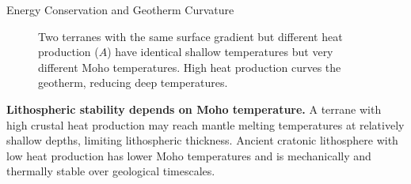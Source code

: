 \begin{activity}{Energy Conservation and Geotherm Curvature}
{{\begin{figure}[h]
\caption{Two terranes with the same surface gradient but different heat production ($A$) have identical shallow temperatures but very different Moho temperatures. High heat production curves the geotherm, reducing deep temperatures.}
\end{figure}
}

\textbf{Lithospheric stability depends on Moho temperature.} A terrane with high crustal heat production may reach mantle melting temperatures at relatively shallow depths, limiting lithospheric thickness. Ancient cratonic lithosphere with low heat production has lower Moho temperatures and is mechanically and thermally stable over geological timescales.
}

\end{activity}